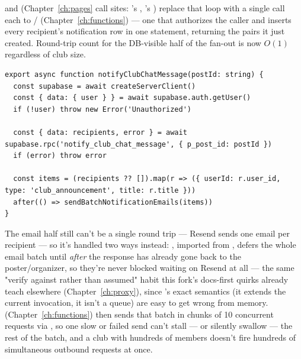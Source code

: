  and  (Chapter~\ref{ch:pages} call sites: 's , 's ) replace that loop with a single call each to / (Chapter~\ref{ch:functions}) — one  that authorizes the caller and inserts every recipient's notification row in one statement, returning the  pairs it just created. Round-trip count for the DB-visible half of the fan-out is now $O(1)$ regardless of club size.

\begin{lstlisting}[caption={the shape of both, from src/lib/notifications.ts}]
export async function notifyClubChatMessage(postId: string) {
  const supabase = await createServerClient()
  const { data: { user } } = await supabase.auth.getUser()
  if (!user) throw new Error('Unauthorized')

  const { data: recipients, error } = await supabase.rpc('notify_club_chat_message', { p_post_id: postId })
  if (error) throw error

  const items = (recipients ?? []).map(r => ({ userId: r.user_id, type: 'club_announcement', title: r.title }))
  after(() => sendBatchNotificationEmails(items))
}
\end{lstlisting}

The email half still can't be a single round trip — Resend sends one email per recipient — so it's handled two ways instead: , imported from , defers the whole email batch until \emph{after} the response has already gone back to the poster/organizer, so they're never blocked waiting on Resend at all — the same "verify against  rather than assumed" habit this fork's docs-first quirks already teach elsewhere (Chapter~\ref{ch:proxy}), since 's exact semantics (it extends the current invocation, it isn't a queue) are easy to get wrong from memory.  (Chapter~\ref{ch:functions}) then sends that batch in chunks of 10 concurrent requests via , so one slow or failed send can't stall — or silently swallow — the rest of the batch, and a club with hundreds of members doesn't fire hundreds of simultaneous outbound requests at once.

